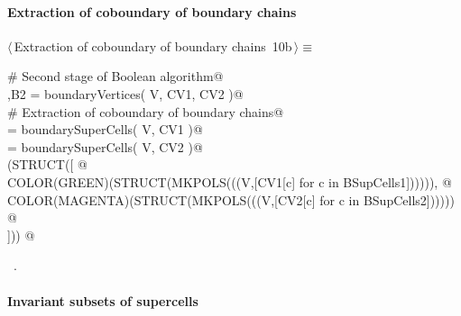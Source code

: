 \documentclass[11pt,oneside]{article}	%
\begin{document}
\paragraph{Extraction of coboundary of boundary chains}
\begin{flushleft} \small \label{scrap17}
\protect{}$\langle\,$Extraction of coboundary of boundary chains\nobreak\ {\footnotesize 10b}$\,\rangle\equiv$
\vspace{-1ex}
\begin{list}{}{} \item
\mbox{}\verb@# Second stage of Boolean algorithm@\\
\mbox{},B2 = boundaryVertices( V, CV1, CV2 )@\\
\mbox{}\verb@# Extraction of coboundary of boundary chains@\\
\mbox{} = boundarySuperCells( V, CV1 )@\\
\mbox{} = boundarySuperCells( V, CV2 )@\\
\mbox{}\verb@VIEW(STRUCT([ @\\
\mbox{}\verb@   COLOR(GREEN)(STRUCT(MKPOLS(((V,[CV1[c] for c in BSupCells1]))))), @\\
\mbox{}\verb@   COLOR(MAGENTA)(STRUCT(MKPOLS(((V,[CV2[c] for c in BSupCells2]))))) @\\
\mbox{}\verb@])) @\\
\mbox{}\verb@@{\NWsep}
\end{list}
\vspace{-1ex}
\footnotesize\addtolength{\baselineskip}{-1ex}
\begin{list}{}{\setlength{\itemsep}{-\parsep}\setlength{\itemindent}{-\leftmargin}}
\item \NWtxtMacroRefIn\ .
\end{list}
\end{flushleft}
\paragraph{Invariant subsets of supercells}
\end{document}
